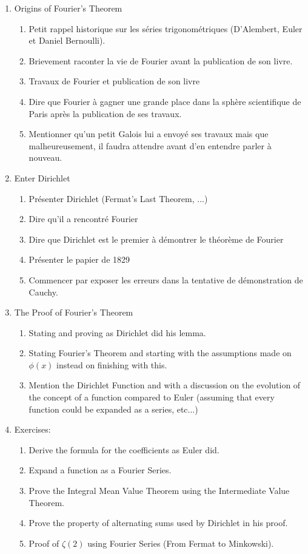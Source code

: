 \begin{enumerate}
    \item Origins of Fourier's Theorem
    \begin{enumerate}
        \item Petit rappel historique sur les séries trigonométriques (D'Alembert, Euler et Daniel Bernoulli).
        \item Brievement raconter la vie de Fourier avant la publication de son livre.
        \item Travaux de Fourier et publication de son livre
        \item Dire que Fourier à gagner une grande place dans la sphère scientifique de Paris après la publication de ses travaux.
        \item Mentionner qu'un petit Galois lui a envoyé ses travaux mais que malheureusement, il faudra attendre avant d'en entendre parler à nouveau.
    \end{enumerate}
    \item Enter Dirichlet
    \begin{enumerate}
        \item Présenter Dirichlet (Fermat's Last Theorem, ...)
        \item Dire qu'il a rencontré Fourier
        \item Dire que Dirichlet est le premier à démontrer le théorème de Fourier
        \item Présenter le papier de 1829
        \item Commencer par exposer les erreurs dans la tentative de démonstration de Cauchy.
    \end{enumerate}
    \item The Proof of Fourier's Theorem
    \begin{enumerate}
        \item Stating and proving as Dirichlet did his lemma.
        \item Stating Fourier's Theorem and starting with the assumptions made on $\phi(x)$ instead on finishing with this.
        \item Mention the Dirichlet Function and with a discussion on the evolution of the concept of a function compared to Euler (assuming that every function could be expanded as a series, etc...)
    \end{enumerate}
    \item Exercises:
    \begin{enumerate}
        \item Derive the formula for the coefficients as Euler did.
        \item Expand a function as a Fourier Series.
        \item Prove the Integral Mean Value Theorem using the Intermediate Value Theorem.
        \item Prove the property of alternating sums used by Dirichlet in his proof.
        \item Proof of $\zeta(2)$ using Fourier Series (From Fermat to Minkowski).
    \end{enumerate}
\end{enumerate}

